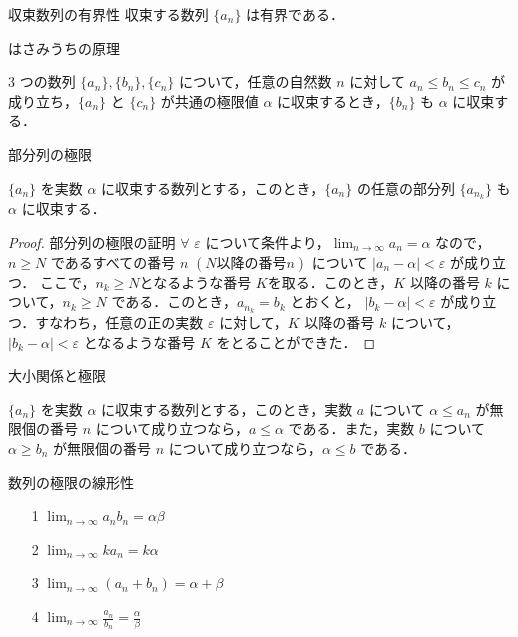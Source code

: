 \documentclass[a4paper]{ltjsarticle}
\begin{document}
\begin{theorem}{収束数列の有界性}{}
収束する数列 $\{a_n\}$ は有界である．
\end{theorem}

\begin{theorem}{はさみうちの原理}{}

3 つの数列 $\{a_n\}, \{b_n\}, \{c_n\}$ について，任意の自然数 $n$ に対して $a_n \leq b_n \leq c_n$ が成り立ち，$\{a_n\}$ と $\{c_n\}$ が共通の極限値 $\alpha$ に収束するとき，$\{b_n\}$ も $\alpha$ に収束する．

\end{theorem}

\begin{theorem}{部分列の極限}{}

$\{a_n\}$ を実数 $\alpha$ に収束する数列とする，このとき，$\{a_n\}$ の任意の部分列 $\{a_{n_k}\}$ も $\alpha$ に収束する．

\end{theorem}

\begin{proof}{部分列の極限の証明}{}
$\forall$ $\varepsilon$ について条件より，$\lim_{n \to \infty} a_n = \alpha$ なので，$n \geq N$ であるすべての番号 $n$ $(N 以降の番号 n)$ について $|a_n - \alpha| < \varepsilon$ が成り立つ．
ここで，$n_k \geq N $となるような番号 $K $を取る．このとき，$K$ 以降の番号 $k$ について，$n_k \geq N$ である．このとき，$a_{n_k} = b_k$ とおくと，
$|b_k - \alpha| < \varepsilon$ が成り立つ．すなわち，任意の正の実数 $\varepsilon$ に対して，$K$ 以降の番号 $k$ について，$|b_k - \alpha| < \varepsilon$ となるような番号 $K$ をとることができた．
\end{proof}

\begin{theorem}{大小関係と極限}{}

$\{a_n\}$ を実数 $\alpha$ に収束する数列とする，このとき，実数 $a$ について $\alpha \leq a_n$ が無限個の番号 $n$ について成り立つなら，$a \leq \alpha$ である．また，実数 $b$ について $\alpha \geq b_n$ が無限個の番号 $n$ について成り立つなら，$\alpha \leq b$ である．

\end{theorem}

\pagebreak
\begin{theorem}{数列の極限の線形性}{}
\begin{itemize}
\item[1 ] $\lim_{n \to \infty} a_n b_n = \alpha \beta$
\item[2 ] $\lim_{n \to \infty} k a_n = k\alpha$
\item[3 ] $\lim_{n \to \infty} (a_n + b_n) = \alpha + \beta$
\item[4 ] $\lim_{n \to \infty} \frac{a_n}{b_n} = \frac{\alpha}{\beta}$
\end{itemize}
\end{theorem}
\end{document}
